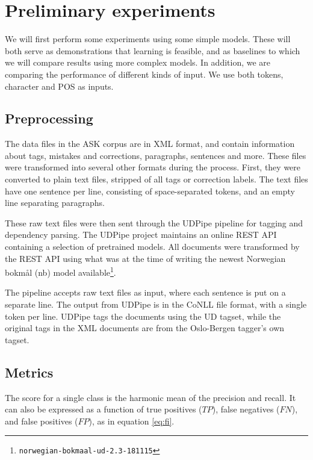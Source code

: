 \chapter{Preliminary experiments}

We will first perform some experiments using some simple models. These will
both serve as demonstrations that learning is feasible, and as baselines
to which we will compare results using more complex models. In addition,
we are comparing the performance of different kinds of input. We use both
tokens, character \ngrams and \ac{POS} \ngrams as inputs.


\section{Preprocessing}

The data files in the ASK corpus are in \ac{XML} format, and contain information
about tags, mistakes and corrections, paragraphs, sentences and more. These
files were transformed into several other formats during the process. First,
they were converted to plain text files, stripped of all tags or correction
labels. The text files have one sentence per line, consisting of
space-separated tokens, and an empty line separating paragraphs.

These raw text files were then sent through the UDPipe pipeline
\autocite{udpipe:2017} for tagging and dependency parsing. The UDPipe project
maintains an online REST \ac{API} containing a selection of pretrained models.
All documents were transformed by the REST \ac{API} using what was at
the time of writing the newest Norwegian bokmål (nb) model
available\footnote{\texttt{norwegian-bokmaal-ud-2.3-181115}}.

The pipeline accepts raw text files as input, where each sentence is put on a
separate line. The output from UDPipe is in the CoNLL file format, with a
single token per line. UDPipe tags the documents using the UD tagset, while
the original tags in the \ac{XML} documents are from the Oslo-Bergen tagger's own
tagset.


\section{Metrics}

The \FI score for a single class is the harmonic mean of the precision and
recall. It can also be expressed as a function of true positives ($TP$), false negatives ($FN$),
and false positives ($FP$), as in equation \ref{eq:fi}.

